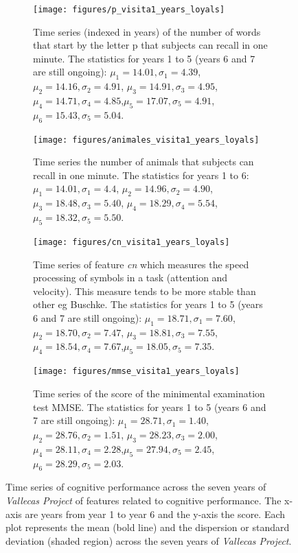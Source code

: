 \documentclass[11pt]{article}
\theoremstyle{definition}
\theoremstyle{remark}
\begin{document}
\begin{figure}[H]
    \centering
    \begin{subfigure}[t]{0.45\textwidth}
        \centering
        \texttt{[image: figures/p\_visita1\_years\_loyals]}
        \caption{Time series (indexed in years) of the  number of words that start by the letter p that subjects can recall in one minute. The statistics for years 1 to 5 (years 6 and 7 are still ongoing): $\mu_{1}=14.01, \sigma_{1}=4.39$, $\mu_{2}=14.16, \sigma_{2}=4.91$, $\mu_{3}=14.91, \sigma_{3}=4.95$, $\mu_{4}=14.71, \sigma_{4}=4.85$,$\mu_{5}=17.07,\sigma_{5}=4.91$, $\mu_{6}=15.43,\sigma_{5}=5.04$.}
    \end{subfigure}
    \hfill
    \begin{subfigure}[t]{0.45\textwidth}
        \centering
        \texttt{[image: figures/animales\_visita1\_years\_loyals]}
        \caption{Time series the  number of animals that subjects can recall in one minute. The statistics for years 1 to 6: $\mu_{1}=14.01, \sigma_{1}=4.4$, $\mu_{2}=14.96, \sigma_{2}=4.90$, $\mu_{3}=18.48, \sigma_{3}=5.40$, $\mu_{4}=18.29, \sigma_{4}=5.54$,$\mu_{5}=18.32,\sigma_{5}=5.50$.}
    \end{subfigure}%
    
     \begin{subfigure}[t]{0.45\textwidth}
        \centering
        \texttt{[image: figures/cn\_visita1\_years\_loyals]}
        \caption{Time series of feature \emph{cn} which measures the speed processing of symbols in a task (attention and velocity). This measure tends to be more stable than other eg Buschke. The statistics for years 1 to 5 (years 6 and 7 are still ongoing): $\mu_{1}=18.71, \sigma_{1}=7.60$, $\mu_{2}=18.70, \sigma_{2}=7.47$, $\mu_{3}=18.81, \sigma_{3}=7.55$, $\mu_{4}=18.54, \sigma_{4}=7.67$,$\mu_{5}=18.05,\sigma_{5}=7.35$.}
    \end{subfigure}
    \hfill
    \begin{subfigure}[t]{0.45\textwidth}
        \centering
        \texttt{[image: figures/mmse\_visita1\_years\_loyals]}
        \caption{Time series of the score of the minimental examination test MMSE. The statistics for years 1 to 5 (years 6 and 7 are still ongoing): $\mu_{1}=28.71, \sigma_{1}=1.40$, $\mu_{2}=28.76, \sigma_{2}=1.51$, $\mu_{3}=28.23, \sigma_{3}=2.00$, $\mu_{4}=28.11, \sigma_{4}=2.28$,$\mu_{5}=27.94,\sigma_{5}=2.45$, $\mu_{6}=28.29,\sigma_{5}=2.03$.}
    \end{subfigure}%
   
    \caption{Time series of cognitive performance across the seven years of \emph{Vallecas Project} of features related to cognitive performance. The x-axis are years from year 1 to year 6 and the y-axis the score. Each plot represents the mean (bold line) and the dispersion or standard deviation (shaded region) across the seven years of \emph{Vallecas Project}.}
    \label{fig:cogper4}
\end{figure}
\end{document}
